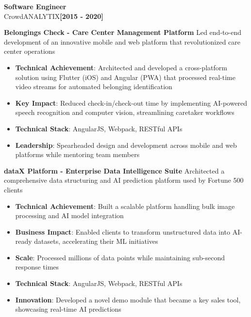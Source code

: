 \documentclass[letterpaper,10pt]{article}
\newcommand{\timelineEntry}[3]{%
	\noindent\color{accent}\large\textbf{#1}\\
	{\color{accent}#2}\hfill\textbf{\color{accent}\small[#3]}
	\newline\newline
}
\begin{document}
\timelineEntry{Software Engineer}{CrowdANALYTIX}{2015 - 2020}
\vspace{0.4em}\noindent\large\textbf{Belongings Check - Care Center Management Platform}\newline
\noindent Led end-to-end development of an innovative mobile and web platform that revolutionized care center operations
\begin{itemize}[leftmargin=*, nosep, itemsep=0.4em, before=\vspace{0.6em}, after=\vspace{0.8em}, label={}]
	\item \textbf{Technical Achievement}: Architected and developed a cross-platform solution using Flutter (iOS) and Angular (PWA) that processed real-time video streams for automated belonging identification
	\item \textbf{Key Impact}: Reduced check-in/check-out time by implementing AI-powered speech recognition and computer vision, streamlining caretaker workflows
	\item \textbf{Technical Stack}: AngularJS, Webpack, RESTful APIs
	\item \textbf{Leadership}: Spearheaded design and development across mobile and web platforms while mentoring team members
\end{itemize}

\vspace{0.4em}\noindent\large\textbf{dataX Platform - Enterprise Data Intelligence Suite}\newline
\noindent Architected a comprehensive data structuring and AI prediction platform used by Fortune 500 clients
\begin{itemize}[leftmargin=*, nosep, itemsep=0.4em, before=\vspace{0.6em}, after=\vspace{0.8em}, label={}]
	\item \textbf{Technical Achievement}: Built a scalable platform handling bulk image processing and AI model integration
	\item \textbf{Business Impact}: Enabled clients to transform unstructured data into AI-ready datasets, accelerating their ML initiatives
	\item \textbf{Scale}: Processed millions of data points while maintaining sub-second response times
	\item \textbf{Technical Stack}:  AngularJS, Webpack, RESTful APIs
	\item \textbf{Innovation}: Developed a novel demo module that became a key sales tool, showcasing real-time AI predictions
\end{itemize}
\end{document}

